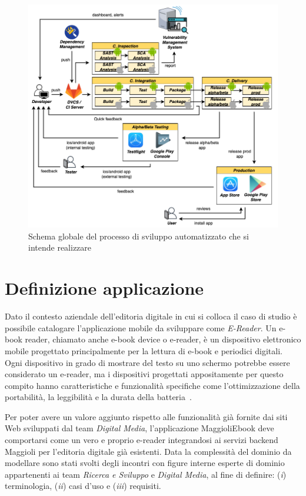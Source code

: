 \begin{figure}[H]
    \includegraphics[width=1\textwidth]{img/full-cicd.png}
    \caption{Schema globale del processo di sviluppo automatizzato che si intende realizzare}
    \label{full-cicd}
\end{figure}

\section{Definizione applicazione}
Dato il contesto aziendale dell'editoria digitale in cui si colloca il caso di studio è possibile catalogare l'applicazione mobile da sviluppare come \textit{E-Reader}. Un e-book reader, chiamato anche e-book device o e-reader, è un dispositivo elettronico mobile progettato principalmente per la lettura di e-book e periodici digitali. Ogni dispositivo in grado di mostrare del testo su uno schermo potrebbe essere considerato un e-reader, ma i dispositivi progettati appositamente per questo compito hanno caratteristiche e funzionalità specifiche come l'ottimizzazione della portabilità, la leggibilità e la durata della batteria~\cite{shoba2014vocabulary}.

Per poter avere un valore aggiunto rispetto alle funzionalità già fornite dai siti Web sviluppati dal team \textit{Digital Media}, l'applicazione MaggioliEbook deve comportarsi come un vero e proprio e-reader integrandosi ai servizi backend Maggioli per l'editoria digitale già esistenti. Data la complessità del dominio da modellare sono stati svolti degli incontri con figure interne esperte di dominio appartenenti ai team \textit{Ricerca e Sviluppo} e \textit{Digital Media}, al fine di definire: (\textit{i}) terminologia, (\textit{ii}) casi d'uso e (\textit{iii}) requisiti.

